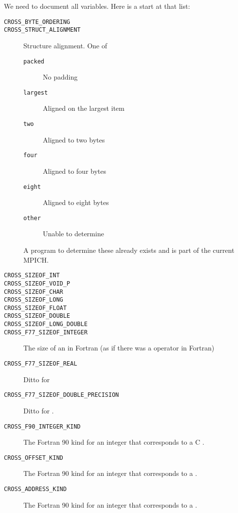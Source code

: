 \documentclass{article}
\begin{document}
We need to document all  variables.  Here is a start at that
list:
\begin{description}
\item[\texttt{CROSS_BYTE_ORDERING}]
\item[\texttt{CROSS_STRUCT_ALIGNMENT}]Structure alignment.  One of 
    \begin{description}
    \item[\texttt{packed}]No padding
    \item[\texttt{largest}]Aligned on the largest item
    \item[\texttt{two}]Aligned to two bytes
    \item[\texttt{four}]Aligned to four bytes
    \item[\texttt{eight}]Aligned to eight bytes
    \item[\texttt{other}]Unable to determine
    \end{description}
    A program to determine these already exists and is part of the
    current MPICH.
\item[\texttt{CROSS_SIZEOF_INT}]
\item[\texttt{CROSS_SIZEOF_VOID_P}]
\item[\texttt{CROSS_SIZEOF_CHAR}]
\item[\texttt{CROSS_SIZEOF_LONG}]
\item[\texttt{CROSS_SIZEOF_FLOAT}]
\item[\texttt{CROSS_SIZEOF_DOUBLE}]
\item[\texttt{CROSS_SIZEOF_LONG_DOUBLE}]
\item[\texttt{CROSS_F77_SIZEOF_INTEGER}]The size of an  in
  Fortran (as if there was a  operator in Fortran)
\item[\texttt{CROSS_F77_SIZEOF_REAL}]Ditto for 
\item[\texttt{CROSS_F77_SIZEOF_DOUBLE_PRECISION}]Ditto for
.
\item[\texttt{CROSS_F90_INTEGER_KIND}]The Fortran 90 kind for an integer that
  corresponds to a C .
\item[\texttt{CROSS_OFFSET_KIND}]The Fortran 90 kind for an integer that
  corresponds to a .
\item[\texttt{CROSS_ADDRESS_KIND}]The Fortran 90 kind for an integer that
  corresponds to a .
\end{description}
\end{document}
